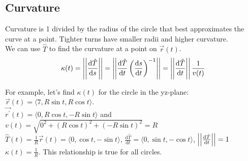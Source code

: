 \subsection{Curvature}
Curvature is 1 divided by the radius of the circle that best approximates the curve at a point. Tighter turns have smaller radii and higher curvature.\\
We can use $\hat{T}$ to find the curvature at a point on $\vec{r}(t)$.\\
\begin{equation*}
	\kappa(t) = \left|\left|\frac{\mathrm{d}\hat{T}}{\mathrm{d}s}\right|\right| = \left|\left|\frac{\mathrm{d}\hat{T}}{\mathrm{d}t}\left(\frac{\mathrm{d}s}{\mathrm{d}t}\right)^{-1}\right|\right| = \left|\left|\frac{\mathrm{d}\hat{T}}{\mathrm{d}t}\right|\right|\frac{1}{v(t)}
\end{equation*}

\noindent
For example, let's find $\kappa(t)$ for the circle in the yz-plane: $\vec{r}(t)=\langle 7, R\sin{t}, R\cos{t} \rangle$.\\
\indent
$\vec{r^\prime}(t)=\langle 0, R\cos{t}, -R\sin{t}\rangle$ and $v(t)=\sqrt{0^2+(R\cos{t})^2+(-R\sin{t})^2}=R$\\
\indent
$\hat{T}(t)=\frac{1}{R}\vec{r}(t)=\langle0,\cos{t},-\sin{t}\rangle$, $\frac{\mathrm{d}\hat{T}}{\mathrm{d}t}=\langle 0,\sin{t},-\cos{t}\rangle$, $\left|\left|\frac{\mathrm{d}\hat{T}}{\mathrm{d}t}\right|\right|=1$\\
\indent
$\kappa(t)=\frac{1}{R}$. This relationship is true for all circles.